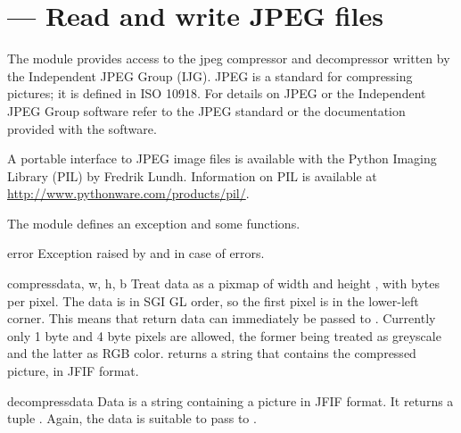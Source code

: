 \section{ ---
         Read and write JPEG files}



The module  provides access to the jpeg compressor and
decompressor written by the Independent JPEG Group
(IJG). JPEG is a standard for
compressing pictures; it is defined in ISO 10918.  For details on JPEG
or the Independent JPEG Group software refer to the JPEG standard or
the documentation provided with the software.

A portable interface to JPEG image files is available with the Python
Imaging Library (PIL) by Fredrik Lundh.  Information on PIL is
available at \url{http://www.pythonware.com/products/pil/}.

The  module defines an exception and some functions.

\begin{excdesc}{error}
Exception raised by  and 
in case of errors.
\end{excdesc}

\begin{funcdesc}{compress}{data, w, h, b}
Treat data as a pixmap of width  and height , with
 bytes per pixel.  The data is in SGI GL order, so the first
pixel is in the lower-left corner. This means that 
return data can immediately be passed to .
Currently only 1 byte and 4 byte pixels are allowed, the former being
treated as greyscale and the latter as RGB color.
 returns a string that contains the compressed
picture, in JFIF format.
\end{funcdesc}

\begin{funcdesc}{decompress}{data}
Data is a string containing a picture in JFIF format. It
returns a tuple .  Again, the data is suitable to pass to
.
\end{funcdesc}

